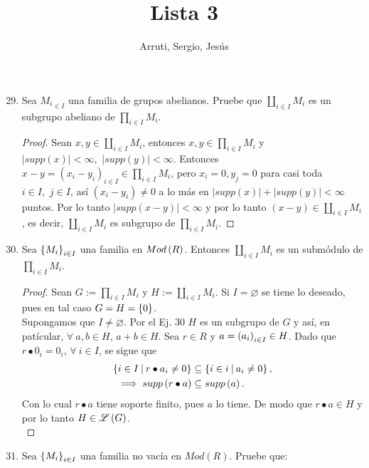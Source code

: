 \documentclass{article}
\title{Lista 3	}
\author{Arruti, Sergio, Jesús}
\date{}
\begin{document}
	\maketitle
	\begin{enumerate}[label=\textbf{Ej \arabic*.}]
		\setcounter{enumi}{28}
		
		
\item Sea ${M_i}_{\in I}$ una familia de grupos abelianos. Pruebe que $\displaystyle\coprod_{i\in I}M_i$ 
es un subgrupo abeliano de $\displaystyle\prod_{i\in I}M_i$.\\

\begin{proof}
Sean $x,y\in \displaystyle\coprod_{i\in I}M_i$, entonces $x,y\in \displaystyle\prod_{i\in I}M_i$ y\\ $|supp(x)|<\infty,\,\, |supp(y)|<\infty$. 
Entonces $x-y=(x_i-y_i)_{i\in I}\in \displaystyle\prod_{i\in I}M_i$, pero $x_i=0, y_j=0$ para casi toda $i\in I,\,\,j\in I$, así $(x_i-y_i)\neq 0$ a lo más en
$|supp(x)|+|supp(y)|<\infty$ puntos. Por lo tanto $|supp(x-y)|<\infty$ y por lo tanto $(x-y)\in \displaystyle\coprod_{i\in I}M_i$, es decir,
 $\displaystyle\coprod_{i\in I}M_i$ es subgrupo de $\displaystyle\prod_{i\in I}M_i$.

\end{proof}		
		
		\item Sea ${\left\{{M}_{i}\right\}}_{i\in I}$ una familia en $Mod\left(R\right)$. Entonces $\coprod_{i\in I}M_i$ es un submódulo de $\prod_{i\in I}M_i$.
		\begin{proof}
			Sean $G:=\prod_{i\in I}M_i$ y $H:=\coprod_{i\in I}M_i$. Si $I=\varnothing$ se tiene lo deseado, pues  en tal caso $G=H=\left\{0\right\}$.\\
		Supongamos que $I\neq\varnothing$.
		 Por el Ej. 30 $H$ es un subgrupo de $G$ y así, en patícular, $\forall\ a,b\in H$, $a+b\in H$. Sea $r\in R$ y $a={\left({a}_{i}\right)}_{i\in I}\in H$. Dado que $r\bullet 0_i=0_i$, $\forall\ i\in I$, se sigue que
			\begin{align*}
			\descset{i}{I}{r\bullet a_i\neq 0}&\subseteq\descset{i}{i}{a_i\neq 0},\\
			\implies supp\lrprth{r\bullet a}&\subseteq supp\lrprth{a}.
			\end{align*} 
		Con lo cual $r\bullet a$ tiene soporte finito, pues $a$ lo tiene. De modo que $r\bullet a\in H$ y por lo tanto $H\in\mathscr{L}\left(G\right)$.\\
		\end{proof}
		\item Sea ${\left\{{M}_{i}\right\}}_{i\in I}$ una familia no vacía en $Mod(R)$. Pruebe que:
		\begin{enumerate}


\end{enumerate}
\end{enumerate}
\end{document}

